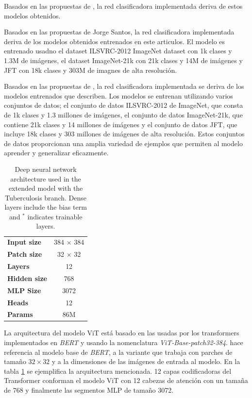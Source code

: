 {Basados en las propuestas de \citeauthor{DBLP:journals/corr/abs-2010-11929}, la red clasificadora
implementada deriva de estos modelos obtenidos.

Basados en las propuestas de Jorge Santos, la red clasificadora implementada deriva de los modelos
obtenidos entrenados en este articulos. El modelo es entrenado usadno el dataset ILSVRC-2012 ImageNet
dataset con 1k clases y 1.3M de imágenes, el dataset ImageNet-21k con 21k clases y 14M de imágenes y
JFT con 18k clases y 303M de imagnes de alta resolución.

Basados en las propuestas de \citeauthor{DBLP:journals/corr/abs-2010-11929}, la red clasificadora
implementada se deriva de los modelos entrenados que describen. Los modelos se entrenan utilizando
varios conjuntos de datos; el conjunto de datos ILSVRC-2012 de ImageNet, que consta de 1k clases y
1.3 millones de imágenes, el conjunto de datos ImageNet-21k, que contiene 21k clases y 14 millones
de imágenes y el conjunto de datos JFT, que incluye 18k clases y 303 millones de imágenes de alta
resolución. Estos conjuntos de datos proporcionan una amplia variedad de ejemplos que permiten al
modelo aprender y generalizar eficazmente.

\begin{table}[!ht]
    \centering
    \begin{tabular}{| l | c |}
     \hline
    \textbf{Input size}  & 384 $\times$ 384 \\
    \textbf{Patch size}  & 32 $\times$ 32 \\
    \textbf{Layers}      & 12  \\
    \textbf{Hidden size} & 768 \\
    \textbf{MLP Size}    & 3072 \\
    \textbf{Heads}       & 12 \\
    \textbf{Params}      & 86M \\
     \hline
    \end{tabular}
    \caption{Deep neural network architecture used in the extended model with the Tuberculosis branch. Dense layers include the bias term and $^\ast$ indicates trainable layers.}
\label{table_ViTBase}
\end{table}

La arquitectura del modelo ViT está basado en las usadas
por los transformers implementados en \textit{BERT} \cite{DBLP:journals/corr/abs-1810-04805} y
usando la nomenclatura \textit{ViT-Base-patch32-384}.  hace referencia al modelo base de
\textit{BERT},  a la variante que trabaja con parches de tamaño $32 \times 32$ y
 a la dimensiones de las imágenes de entrada al modelo. En la tabla \ref{table_ViTBase}
se ejemplifica la arquitectura mencionada. 12 capas codificadoras del Transformer conforman el modelo
ViT con 12 cabezas de atención con un tamaña de 768 y finalmente las segmentos MLP de tamaño 3072.


}
